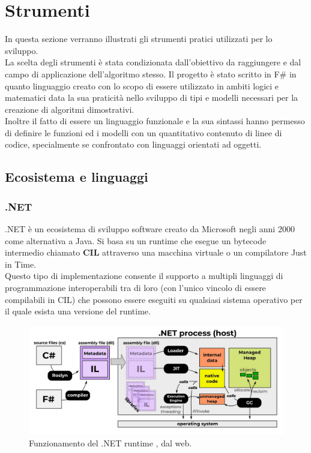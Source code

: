 \documentclass[\main/tesi.tex]{subfiles}
\begin{document}
\chapter{Strumenti}

In questa sezione verranno illustrati gli strumenti pratici utilizzati per lo sviluppo. \\
La scelta degli strumenti è stata condizionata dall'obiettivo da raggiungere e dal campo di applicazione dell'algoritmo stesso.
Il progetto è stato scritto in F\# \cite{fsharp} in quanto linguaggio creato con lo scopo di essere utilizzato in ambiti logici e matematici data la sua praticità nello sviluppo di tipi e modelli necessari per la creazione di algoritmi dimostrativi. \\
Inoltre il fatto di essere un linguaggio funzionale e la sua sintassi hanno permesso di definire le funzioni ed i modelli con un quantitativo contenuto di linee di codice, specialmente se confrontato con linguaggi orientati ad oggetti. \\

\section{Ecosistema e linguaggi}
\subsection{.NET}
.NET è un ecosistema di sviluppo software creato da Microsoft negli anni 2000 come alternativa a Java. Si basa su un runtime che esegue un bytecode intermedio chiamato \textbf{CIL} \cite{cil} attraverso una macchina virtuale o un compilatore Just in Time.\\
Questo tipo di implementazione consente il supporto a multipli linguaggi di programmazione interoperabili tra di loro (con l'unico vincolo di essere compilabili in CIL) che possono essere eseguiti su qualsiasi sistema operativo per il quale esista una versione del runtime.

\begin{figure}[h]
    \caption{Funzionamento del .NET runtime \cite{dotnet}, dal web.}
    \includegraphics[width=\textwidth]{../images/dotnet.png}
\end{figure}
\end{document}
